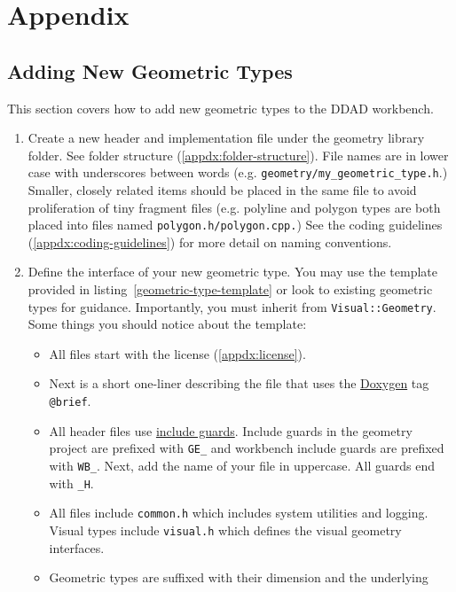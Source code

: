 
\section{Appendix}

\subsection{Adding New Geometric Types}\label{appdx:adding-new-geometric-types}

This section covers how to add new geometric types to the DDAD workbench.

\begin{enumerate}
  \item Create a new header and implementation file under the geometry library
  folder. See folder structure (\ref{appdx:folder-structure}). File names are in
  lower case with underscores between words (e.g. \texttt{geometry/my\_geometric\_type.h}.)
  Smaller, closely related items should be placed in the same file to avoid
  proliferation of tiny fragment files (e.g. polyline and polygon types are both placed into
  files named \texttt{polygon.h/polygon.cpp.}) See the coding
  guidelines (\ref{appdx:coding-guidelines}) for more detail on naming
  conventions.
  \item Define the interface of your new geometric type. You may use the
  template provided in listing~\ref{geometric-type-template} or look to existing
  geometric types for guidance.
  Importantly, you must inherit from \texttt{Visual::Geometry}. Some things you
  should notice about the template:
  \begin{itemize}
    \item All files start with the license (\ref{appdx:license}). 
    \item Next is a short one-liner describing the file that uses the
    \href{http://www.stack.nl/~dimitri/doxygen/}{Doxygen} tag \texttt{@brief}.
    \item All header files use
    \href{http://en.wikipedia.org/wiki/Include\_guard}{include guards}. Include
    guards in the geometry project are prefixed with \texttt{GE\_} and workbench
    include guards are prefixed with \texttt{WB\_}. Next, add the name of your
    file in uppercase. All guards end with \texttt{\_H}.
    \item All files include \texttt{common.h} which includes system utilities
    and logging. Visual types include \texttt{visual.h} which defines the visual
    geometry interfaces.
    \item Geometric types are suffixed with their dimension and the underlying

\end{itemize}
\end{enumerate}
